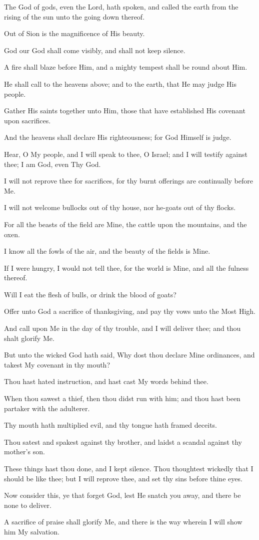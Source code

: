 The God of gods, even the Lord, hath spoken, and called the earth from the rising of the sun unto the going down thereof.

Out of Sion is the magnificence of His beauty.

God our God shall come visibly, and shall not keep silence.

A fire shall blaze before Him, and a mighty tempest shall be round about Him.

He shall call to the heavens above; and to the earth, that He may judge His people.

Gather His saints together unto Him, those that have established His covenant upon sacrifices.

And the heavens shall declare His righteousness; for God Himself is judge.

Hear, O My people, and I will speak to thee, O Israel; and I will testify against thee; I am God, even Thy God.

I will not reprove thee for sacrifices, for thy burnt offerings are continually before Me.

I will not welcome bullocks out of thy house, nor he-goats out of thy flocks.

For all the beasts of the field are Mine, the cattle upon the mountains, and the oxen.

I know all the fowls of the air, and the beauty of the fields is
Mine.

If I were hungry, I would not tell thee, for the world is Mine, and all the fulness thereof.

Will I eat the flesh of bulls, or drink the blood of goats?

Offer unto God a sacrifice of thanksgiving, and pay thy vows unto the Most High.

And call upon Me in the day of thy trouble, and I will deliver thee; and thou shalt glorify Me.

But unto the wicked God hath said, Why dost thou declare Mine ordinances, and takest My covenant in thy mouth?

Thou hast hated instruction, and hast cast My words behind thee.

When thou sawest a thief, then thou didst run with him; and thou hast been partaker with the adulterer.

Thy mouth hath multiplied evil, and thy tongue hath framed deceits.

Thou satest and spakest against thy brother, and laidst a scandal against thy mother's son.

These things hast thou done, and I kept silence. Thou thoughtest wickedly that I should be like thee; but I will reprove thee, and set thy sins before thine eyes.

Now consider this, ye that forget God, lest He snatch you away, and there be none to deliver.

A sacrifice of praise shall glorify Me, and there is the way wherein I will show him My salvation.
